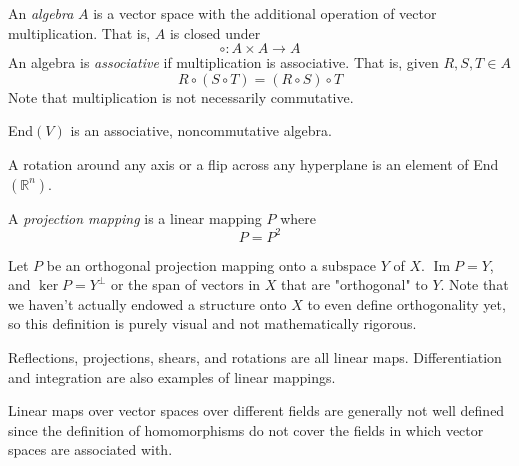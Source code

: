 \documentclass{article}
\DeclareMathOperator{\im}{Im}
\begin{document}
  \begin{definition}
    An \textit{algebra} $A$ is a vector space with the additional operation of vector multiplication. That is, $A$ is closed under 
    \begin{equation}
      \circ: A \times A \longrightarrow A
    \end{equation}
    An algebra is \textit{associative} if multiplication is associative. That is, given $R, S, T \in A$
    \begin{equation}
      R \circ (S \circ T) = (R \circ S) \circ T
    \end{equation}
    Note that multiplication is not necessarily commutative. 
  \end{definition}

  \begin{proposition}
    End$(V)$ is an associative, noncommutative algebra. 
  \end{proposition}

  \begin{example}
    A rotation around any axis or a flip across any hyperplane is an element of End$(\mathbb{R}^n)$. 
  \end{example}

  \begin{definition}
    A \textit{projection mapping} is a linear mapping $P$ where 
    \begin{equation}
      P = P^2
    \end{equation}
  \end{definition}

  \begin{example}
    Let $P$ be an orthogonal projection mapping onto a subspace $Y$ of $X$. $\im P = Y$, and $\ker P = Y^\perp$ or the span of vectors in $X$ that are "orthogonal" to $Y$. Note that we haven't actually endowed a structure onto $X$ to even define orthogonality yet, so this definition is purely visual and not mathematically rigorous. 
  \end{example}

  \begin{example}
    Reflections, projections, shears, and rotations are all linear maps. Differentiation and integration are also examples of linear mappings. 
  \end{example}

  Linear maps over vector spaces over different fields are generally not well defined since the definition of homomorphisms do not cover the fields in which vector spaces are associated with. 
\end{document}
